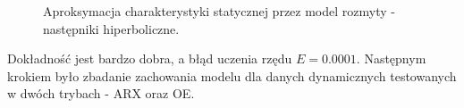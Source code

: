 \begin{figure}[h!]
\hfill
{}
\caption{Aproksymacja charakterystyki statycznej przez model rozmyty - następniki hiperboliczne.}
\end{figure}

\noindent Dokładność jest bardzo dobra, a błąd uczenia rzędu $E = \num{0.0001}$. Następnym krokiem było zbadanie zachowania modelu dla danych dynamicznych testowanych w dwóch trybach - ARX oraz OE.


